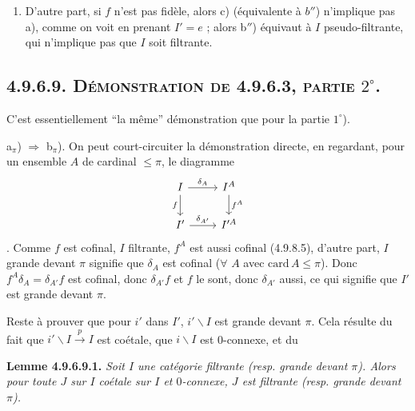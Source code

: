 \documentclass[11pt]{article}
\newcommand{\msp}[1]{\marginpar{\footnotesize [#1]}}
\newcommand{\bs}{\backslash}
\begin{document}
\begin{enumerate}[label=\arabic*$^\circ$)]
\item D'autre part, si $f$ n'est pas fidèle, alors c) (équivalente à $b''$) n'implique pas a), comme on voit en prenant $I' = e$ ; alors b$''$) équivaut à $I$ pseudo-filtrante, qui n'implique pas que $I$ soit filtrante.
\end{enumerate}

\subsection*{\msp{page 237}\textbf{4.9.6.9.} \textsc{Démonstration de 4.9.6.3, partie} $2^\circ$.}

C'est essentiellement “la même” démonstration que pour la partie $1^\circ$).

a$_\pi$) $\Longrightarrow$ b$_\pi$). On peut court-circuiter la démonstration directe, en regardant, pour un ensemble $A$ de cardinal $\leqslant \pi$, le diagramme
\[
\begin{tikzcd}
I \arrow[r, "\delta_A"] \arrow[d, "f"'] & I^A \arrow[d, "f^A"] \\
I' \arrow[r, "\delta_{A'}"] & I'^A
\end{tikzcd}
\]
. Comme $f$ est cofinal, $I$ filtrante, $f^A$ est aussi cofinal (4.9.8.5), d'autre part, $I$ grande devant $\pi$ signifie que $\delta_A$ est cofinal ($\forall$ $A$ avec $\mathrm{card}\, A \leqslant \pi$). Donc $f^A\delta_A = \delta_{A'}f$ est cofinal, donc $\delta_{A'}f$ et $f$ le sont, donc $\delta_{A'}$ aussi, ce qui signifie que $I'$ est grande devant $\pi$.

Reste à prouver que pour $i'$ dans $I'$, $i'\bs I$ est grande devant $\pi$. Cela résulte du fait que $i'\bs I \xrightarrow{p} I$ est coétale, que $i\bs I$ est 0-connexe, et du

\textbf{Lemme 4.9.6.9.1.} \textit{Soit $I$ une catégorie filtrante (resp. grande devant $\pi$). Alors pour toute $J$ sur $I$ coétale sur $I$ et $0$-connexe, $J$ est filtrante (resp. grande devant $\pi$).}
\end{document}
